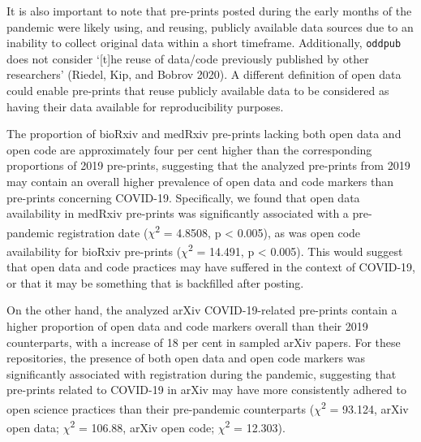\documentclass[
]{article}
\begin{document}
It is also important to note that pre-prints posted during the early months of the pandemic were likely using, and reusing, publicly available data sources due to an inability to collect original data within a short timeframe. Additionally, \texttt{oddpub} does not consider `{[}t{]}he reuse of data/code previously published by other researchers' (Riedel, Kip, and Bobrov 2020). A different definition of open data could enable pre-prints that reuse publicly available data to be considered as having their data available for reproducibility purposes.

The proportion of bioRxiv and medRxiv pre-prints lacking both open data and open code are approximately four per cent higher than the corresponding proportions of 2019 pre-prints, suggesting that the analyzed pre-prints from 2019 may contain an overall higher prevalence of open data and code markers than pre-prints concerning COVID-19. Specifically, we found that open data availability in medRxiv pre-prints was significantly associated with a pre-pandemic registration date (\(\chi\)\textsuperscript{2} = 4.8508, p \textless{} 0.005), as was open code availability for bioRxiv pre-prints (\(\chi\)\textsuperscript{2} = 14.491, p \textless{} 0.005). This would suggest that open data and code practices may have suffered in the context of COVID-19, or that it may be something that is backfilled after posting.

On the other hand, the analyzed arXiv COVID-19-related pre-prints contain a higher proportion of open data and code markers overall than their 2019 counterparts, with a increase of 18 per cent in sampled arXiv papers. For these repositories, the presence of both open data and open code markers was significantly associated with registration during the pandemic, suggesting that pre-prints related to COVID-19 in arXiv may have more consistently adhered to open science practices than their pre-pandemic counterparts (\(\chi\)\textsuperscript{2} = 93.124, arXiv open data; \(\chi\)\textsuperscript{2} = 106.88, arXiv open code; \(\chi\)\textsuperscript{2} = 12.303).
\end{document}
